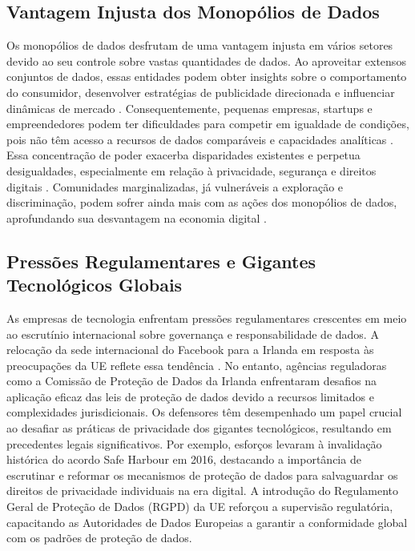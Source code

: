 \documentclass[referee,sn-basic]{sn-jnl}
\theoremstyle{thmstyleone}%
\begin{document}
\subsection{Vantagem Injusta dos Monopólios de Dados}
\hspace{0.7cm}Os monopólios de dados desfrutam de uma vantagem injusta em vários setores devido ao seu controle sobre vastas quantidades de dados. Ao aproveitar extensos conjuntos de dados, essas entidades podem obter insights sobre o comportamento do consumidor, desenvolver estratégias de publicidade direcionada e influenciar dinâmicas de mercado \cite{dataethics}. Consequentemente, pequenas empresas, startups e empreendedores podem ter dificuldades para competir em igualdade de condições, pois não têm acesso a recursos de dados comparáveis e capacidades analíticas \cite{dataethics}. Essa concentração de poder exacerba disparidades existentes e perpetua desigualdades, especialmente em relação à privacidade, segurança e direitos digitais \cite{dataethics}. Comunidades marginalizadas, já vulneráveis a exploração e discriminação, podem sofrer ainda mais com as ações dos monopólios de dados, aprofundando sua desvantagem na economia digital \cite{dataethics}.

\subsection{Pressões Regulamentares e Gigantes Tecnológicos Globais}
\hspace{0.7cm}As empresas de tecnologia enfrentam pressões regulamentares crescentes em meio ao escrutínio internacional sobre governança e responsabilidade de dados. A relocação da sede internacional do Facebook para a Irlanda em resposta às preocupações da UE reflete essa tendência \cite{dataethics}. No entanto, agências reguladoras como a Comissão de Proteção de Dados da Irlanda enfrentaram desafios na aplicação eficaz das leis de proteção de dados devido a recursos limitados e complexidades jurisdicionais. Os defensores têm desempenhado um papel crucial ao desafiar as práticas de privacidade dos gigantes tecnológicos, resultando em precedentes legais significativos. Por exemplo, esforços levaram à invalidação histórica do acordo Safe Harbour em 2016, destacando a importância de escrutinar e reformar os mecanismos de proteção de dados para salvaguardar os direitos de privacidade individuais na era digital. A introdução do Regulamento Geral de Proteção de Dados (RGPD) da UE reforçou a supervisão regulatória, capacitando as Autoridades de Dados Europeias a garantir a conformidade global com os padrões de proteção de dados.
\end{document}
